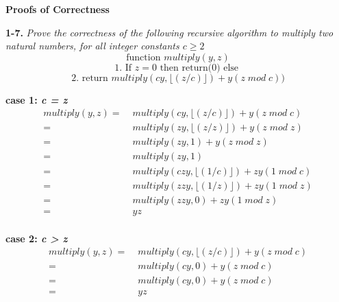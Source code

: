 \textbf{Proofs of Correctness}

\textbf{1-7.} \emph{Prove the correctness of the following recursive algorithm to multiply two
natural numbers, for all integer constants $c\geq 2$} 
   $$\text{function } multiply(y,z)$$ 
   $$\text{1. If  } z = 0 \text{ then return(0) else }$$ 
   $$\text{2. return } multiply(cy, \lfloor(z/c)\rfloor) + y(z \;mod\; c))$$

\begin{minipage}{0.95\textwidth}

\textbf{case 1: \emph{c = z}}
\begin{align*}
multiply(y,z) =& \;multiply(cy, \lfloor(z/c)\rfloor) + y(z \;mod\; c) \\
			  =& \;multiply(zy, \lfloor(z/z)\rfloor) + y(z \;mod\; z) \\
			  =& \;multiply(zy, 1) + y(z\; mod\; z) \\
			  =& \;multiply(zy, 1) \\ 
			  =& \;multiply(czy, \lfloor(1/c)\rfloor) + zy(1 \;mod\; c) \\ 
			  =& \;multiply(zzy, \lfloor(1/z)\rfloor) + zy(1 \;mod\; z) \\ 
			  =& \;multiply(zzy, 0) + zy(1 \;mod\; z) \\ 
			  =& \;yz \\
\end{align*}
\end{minipage}

\begin{minipage}{0.95\textwidth}
\textbf{case 2: \emph{c > z}}
\begin{align*}
multiply(y,z) =& \;multiply(cy, \lfloor(z/c)\rfloor) + y(z \;mod\; c) \\
			  =& \;multiply(cy, 0) + y(z \;mod\; c) \\
			  =& \;multiply(cy, 0) + y(z \;mod\; c) \\
			  =& \;yz \\
\end{align*}
\end{minipage}

